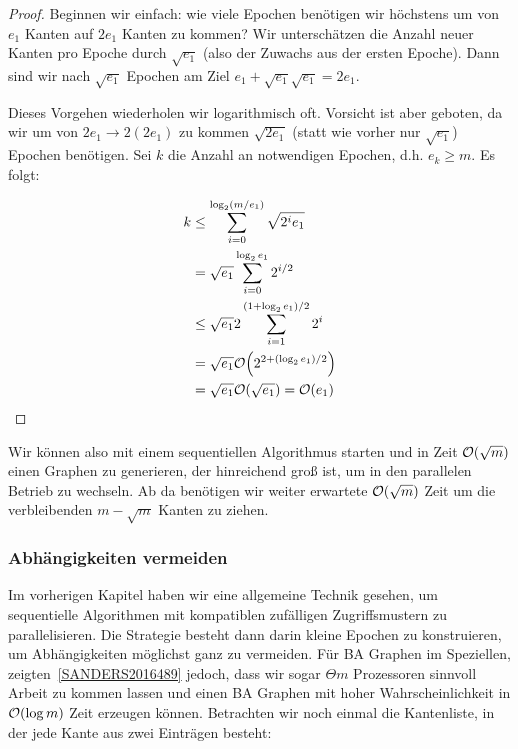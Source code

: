 \begin{proof}
    Beginnen wir einfach: wie viele Epochen benötigen wir höchstens um von $e_1$ Kanten auf $2e_1$ Kanten zu kommen?
    Wir unterschätzen die Anzahl neuer Kanten pro Epoche durch $\sqrt{e_1}$ (also der Zuwachs aus der ersten Epoche).
    Dann sind wir nach $\sqrt{e_1}$ Epochen am Ziel $e_1 + \sqrt{e_1} \sqrt{e_1} = 2 e_1$.

    Dieses Vorgehen wiederholen wir logarithmisch oft.
    Vorsicht ist aber geboten, da wir um von $2e_1 \to 2(2e_1)$ zu kommen $\sqrt{2 e_1}$ (statt wie vorher nur $\sqrt{e_1}$) Epochen benötigen.
    Sei $k$ die Anzahl an notwendigen Epochen, d.h. $e_k \ge m$.
    Es folgt:

    \begin{align}
        k & \le \sum_{i=0}^{\log_2(m/e_1)} \sqrt{2^i e_1}      \\
          & = \sqrt{e_1} \sum_{i=0}^{\log_2 e_1} 2^{i/2}       \\
          & \le \sqrt{e_1} 2 \sum_{i=1}^{(1+\log_2 e_1)/2} 2^i \\
          & = \sqrt{e_1} \mathcal{O}\!\left(2^{2 + (\log_2 e_1) / 2}\right)         \\
          & = \sqrt{e_1} \mathcal{O}\!\left(\sqrt{e_1}\right) = \mathcal{O}\!\left(e_1\right)
    \end{align}
\end{proof}

Wir können also mit einem sequentiellen Algorithmus starten und in Zeit $\mathcal{O}\!\left(\sqrt m\right)$ einen Graphen zu generieren, der hinreichend groß ist, um in den parallelen Betrieb zu wechseln.
Ab da benötigen wir weiter erwartete $\mathcal{O}\!\left(\sqrt m\right)$ Zeit um die verbleibenden $m - \sqrt{m}$ Kanten zu ziehen.

\subsubsection{Abhängigkeiten vermeiden}\label{subsec:ba_sanders}
Im vorherigen Kapitel haben wir eine allgemeine Technik gesehen, um sequentielle Algorithmen mit kompatiblen zufälligen Zugriffsmustern zu parallelisieren.
Die Strategie besteht dann darin kleine Epochen zu konstruieren, um Abhängigkeiten möglichst ganz zu vermeiden.
Für BA Graphen im Speziellen, zeigten~\cref{SANDERS2016489} jedoch, dass wir sogar $\Theta{m}$ Prozessoren sinnvoll Arbeit zu kommen lassen und einen BA Graphen mit hoher Wahrscheinlichkeit in $\mathcal{O}\!\left(\log m\right)$ Zeit erzeugen können.
Betrachten wir noch einmal die  Kantenliste, in der jede Kante aus zwei Einträgen besteht:

